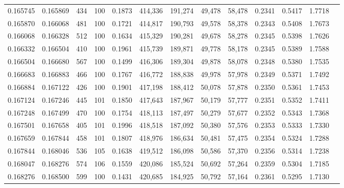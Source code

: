 \begin{tabular}{rrrrrrrrrrrrr}
0.165745 & 0.165869 &   434 & 100 &                                     0.1873 & 414,336 & 191,274 &  49,478 &  58,478 & 0.2341 & 0.5417 & 1.7718 \\
0.165870 & 0.166068 &   481 & 100 &                                     0.1721 & 414,817 & 190,793 &  49,578 &  58,378 & 0.2343 & 0.5408 & 1.7673 \\
0.166068 & 0.166328 &   512 & 100 &                                     0.1634 & 415,329 & 190,281 &  49,678 &  58,278 & 0.2345 & 0.5398 & 1.7626 \\
0.166332 & 0.166504 &   410 & 100 &                                     0.1961 & 415,739 & 189,871 &  49,778 &  58,178 & 0.2345 & 0.5389 & 1.7588 \\
0.166504 & 0.166680 &   567 & 100 &                                     0.1499 & 416,306 & 189,304 &  49,878 &  58,078 & 0.2348 & 0.5380 & 1.7535 \\
0.166683 & 0.166883 &   466 & 100 &                                     0.1767 & 416,772 & 188,838 &  49,978 &  57,978 & 0.2349 & 0.5371 & 1.7492 \\
0.166884 & 0.167122 &   426 & 100 &                                     0.1901 & 417,198 & 188,412 &  50,078 &  57,878 & 0.2350 & 0.5361 & 1.7453 \\
0.167124 & 0.167246 &   445 & 101 &                                     0.1850 & 417,643 & 187,967 &  50,179 &  57,777 & 0.2351 & 0.5352 & 1.7411 \\
0.167248 & 0.167499 &   470 & 100 &                                     0.1754 & 418,113 & 187,497 &  50,279 &  57,677 & 0.2352 & 0.5343 & 1.7368 \\
0.167501 & 0.167658 &   405 & 101 &                                     0.1996 & 418,518 & 187,092 &  50,380 &  57,576 & 0.2353 & 0.5333 & 1.7330 \\
0.167659 & 0.167844 &   458 & 101 &                                     0.1807 & 418,976 & 186,634 &  50,481 &  57,475 & 0.2354 & 0.5324 & 1.7288 \\
0.167844 & 0.168046 &   536 & 105 &                                     0.1638 & 419,512 & 186,098 &  50,586 &  57,370 & 0.2356 & 0.5314 & 1.7238 \\
0.168047 & 0.168276 &   574 & 106 &                                     0.1559 & 420,086 & 185,524 &  50,692 &  57,264 & 0.2359 & 0.5304 & 1.7185 \\
0.168276 & 0.168500 &   599 & 100 &                                     0.1431 & 420,685 & 184,925 &  50,792 &  57,164 & 0.2361 & 0.5295 & 1.7130 \\

\end{tabular}
